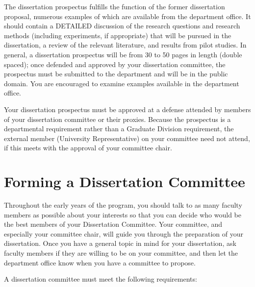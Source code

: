 \documentclass[
]{book}
\begin{document}
The dissertation prospectus fulfills the function of the former dissertation proposal, numerous examples of which are available from the department office. It should contain a DETAILED discussion of the research questions and research methods (including experiments, if appropriate) that will be pursued in the dissertation, a review of the relevant literature, and results from pilot studies. In general, a dissertation prospectus will be from 30 to 50 pages in length (double spaced); once defended and approved by your dissertation committee, the prospectus must be submitted to the department and will be in the public domain. You are encouraged to examine examples available in the department office.

Your dissertation prospectus must be approved at a defense attended by members of your dissertation committee or their proxies. Because the prospectus is a departmental requirement rather than a Graduate Division requirement, the external member (University Representative) on your committee need not attend, if this meets with the approval of your committee chair.

\section{Forming a Dissertation Committee}\label{forming-a-dissertation-committee}

Throughout the early years of the program, you should talk to as many faculty members as possible about your interests so that you can decide who would be the best members of your Dissertation Committee. Your committee, and especially your committee chair, will guide you through the preparation of your dissertation. Once you have a general topic in mind for your dissertation, ask faculty members if they are willing to be on your committee, and then let the department office know when you have a committee to propose.

A dissertation committee must meet the following requirements:
\end{document}
